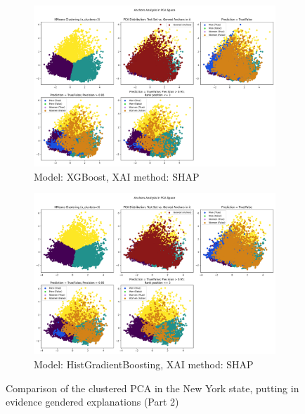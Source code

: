 \begin{figure}[h]
    \ContinuedFloat
    \begin{subfigure}[b]{1.0\textwidth}
        \includegraphics[width=\textwidth]{Images/clustered_pca/clusters_xg_ny_shap.png}
        \caption{Model: XGBoost, XAI method: SHAP}
        \label{fig:clusters_xg_ny_shap}
    \end{subfigure}

    \begin{subfigure}[b]{1.0\textwidth}
        \includegraphics[width=\textwidth]{Images/clustered_pca/clusters_skrub_ny_shap.png}
        \caption{Model: HistGradientBoosting, XAI method: SHAP}
        \label{fig:clusters_skrub_ny_shap}
    \end{subfigure}

    \caption{Comparison of the clustered PCA in the New York state, putting in evidence gendered explanations (Part 2)}
    \label{fig:clusters_ny}
\end{figure}